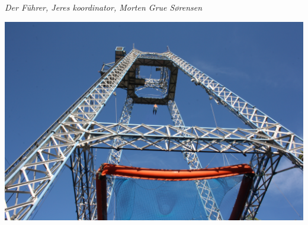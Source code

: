 \begin{minipage}[b]{0.95\linewidth}
\begin{minipage}[t]{0.47\textwidth}
{\flushright\emph{Der Führer, Jeres koordinator, Morten Grue Sørensen}}

\end{minipage}
\begin{center}
\includegraphics[width=\linewidth]{taarn.jpg}
\end{center}
\end{minipage}
